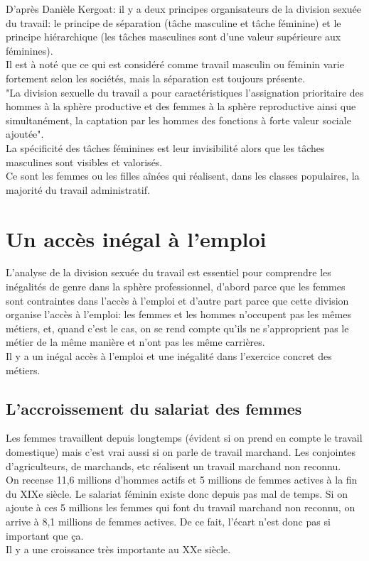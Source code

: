 \documentclass[10pt, a4paper, openany]{book}
\begin{document}
D'après Danièle Kergoat: il y a deux principes  organisateurs de la division sexuée du travail: le principe de séparation (tâche masculine et tâche féminine) et le principe hiérarchique (les tâches masculines sont d'une valeur supérieure aux féminines). \\
Il est à noté que ce qui est considéré comme travail masculin ou féminin varie fortement selon les sociétés, mais la séparation est toujours présente. \\
"La division sexuelle du travail a pour caractéristiques l'assignation prioritaire des hommes à la sphère productive et des femmes à la sphère reproductive ainsi que simultanément, la captation par les hommes des fonctions à forte valeur sociale ajoutée". \\
La spécificité des tâches féminines est leur invisibilité alors que les tâches masculines sont visibles et valorisés. \\
Ce sont les femmes ou les filles aînées qui réalisent, dans les classes populaires, la majorité du travail administratif.


\section{Un accès inégal à l'emploi}

L'analyse de la division sexuée du travail est essentiel pour comprendre les inégalités de genre dans la sphère professionnel, d'abord parce que les femmes sont contraintes dans l'accès à l'emploi et d'autre part parce que cette division organise l'accès à l'emploi: les femmes et les hommes n'occupent pas les mêmes métiers, et, quand c'est le cas, on se rend compte qu'ils ne s'approprient pas le métier de la même manière et n'ont pas les même carrières. \\
Il y a un inégal accès à l'emploi et une inégalité dans l'exercice concret des métiers. 


\subsection{L'accroissement du salariat des femmes}

Les femmes travaillent depuis longtemps (évident si on prend en compte le travail domestique) mais c'est vrai aussi si on parle de travail marchand. Les conjointes d'agriculteurs, de marchands, etc réalisent un travail marchand non reconnu. \\
On recense 11,6 millions d'hommes actifs et 5 millions de femmes actives à la fin du XIXe siècle. Le salariat féminin existe donc depuis pas mal de temps. Si on ajoute à ces 5 millions les femmes qui font du travail marchand non reconnu, on arrive à 8,1 millions de femmes actives. De ce fait, l'écart n'est donc pas si important que ça. \\
Il y a une croissance très importante au XXe siècle.
\end{document}
